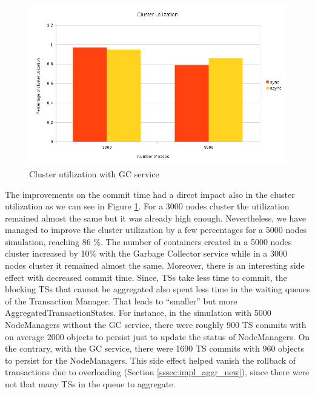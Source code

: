 \begin{figure}
\centering
\includegraphics[scale=0.7]{resources/images/Evaluation/cluster_util_sync_async.png}
\caption{Cluster utilization with GC service}
\label{fig:ev_cluster_util_sync_async}
\end{figure}

The improvements on the commit time had a direct impact also in the
cluster utilization as we can see in Figure
\ref{fig:ev_cluster_util_sync_async}. For a 3000 nodes cluster the
utilization remained almost the same but it was already high
enough. Nevertheless, we have managed to improve the cluster
utilization by a few percentages for a 5000 nodes simulation, reaching
86 $\%$. The number of containers created in a 5000 nodes cluster
increased by 10$\%$ with the Garbage Collector service while in a 3000
nodes cluster it remained almost the same. Moreover, there is an interesting
side effect with decreased commit time. Since, TSs take less time to
commit, the blocking TSs that cannot be aggregated also spent less
time in the waiting queues of the Transaction Manager. That leads to
``smaller'' but more AggregatedTransactionStates. For instance, in the
simulation with 5000 NodeManagers without the GC service, there were
roughly 900 TS commits with on average 2000 objects to persist just
to update the status of NodeManagers. On the contrary, with the GC
service, there were 1690 TS commits with 960 objects to persist for
the NodeManagers. This side effect helped vanish the rollback of
transactions due to overloading (Section \ref{sssec:impl_aggr_new}), 
since there were not that many TSs in the queue to aggregate.